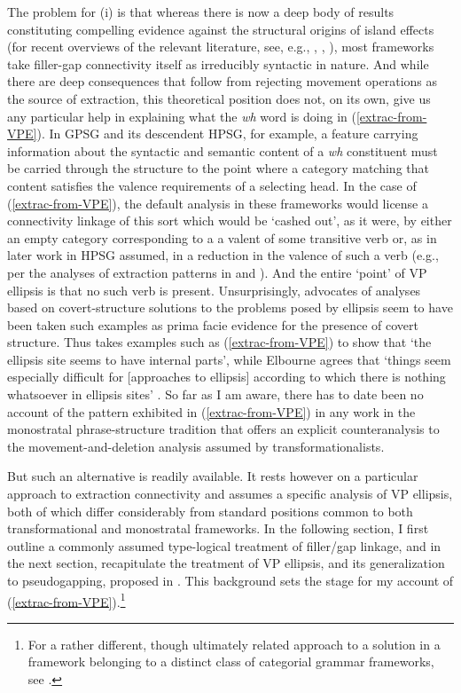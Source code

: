 \documentclass[output=paper,colorlinks,citecolor=brown]{langscibook}
\begin{document}
The problem for (i) is that whereas there is now a deep body of
results constituting compelling evidence against the structural
origins of island effects (for recent overviews of the relevant
literature, see, e.g., \citet{chaves-putnam2020}, \citet{kubotalevineBook}, \citet{liu-et-al2022}),
most frameworks take filler-gap connectivity itself as irreducibly
syntactic in nature. And while there are deep consequences that follow
from rejecting movement operations as the source of extraction, this
theoretical position does not, on its own, give us any particular help
in explaining what the \textit{wh} word is doing in (\ref{extrac-from-VPE}). In
GPSG and its descendent HPSG, for example, a feature carrying
information about the syntactic and semantic content of a \textit{wh}
constituent must be carried through the structure to the point where a
category matching that content satisfies the valence requirements of a
selecting head. In the case of (\ref{extrac-from-VPE}), the default analysis
in these frameworks would license a connectivity linkage of this sort
which would be `cashed out', as it were, by either an empty category
corresponding to a a valent of some transitive verb or, as in later
work in HPSG assumed, in a reduction in the valence of such a verb
(e.g., per the analyses of extraction patterns in \citet{NoordBouma94} and
\citet{BoumaMaloufea01}). And the entire `point' of VP ellipsis is that no such
verb is present. Unsurprisingly, advocates of analyses based on
covert-structure solutions to the problems posed by ellipsis seem to
have been taken such examples as prima facie evidence for the presence
of covert structure.  Thus \citet{johnson2001} takes examples such as
(\ref{extrac-from-VPE}) to show that `the ellipsis site seems to have
internal parts', while Elbourne agrees that `things seem especially
difficult for [approaches to ellipsis] according to which there is
nothing whatsoever in ellipsis sites' \citep[216]{Elbourne2008}.  So far as I
am aware, there has to date been no account of the pattern exhibited
in (\ref{extrac-from-VPE}) in any work in the monostratal phrase-structure
tradition that offers an explicit counteranalysis to the
movement-and-deletion analysis assumed by transformationalists.

But such an alternative is readily available. It rests however on a
particular approach to extraction connectivity and assumes a specific
analysis of VP ellipsis, both of which differ considerably from
standard positions common to both transformational and monostratal
frameworks. In the following section, I first outline a commonly
assumed type-logical treatment of filler/gap linkage, and in the next
section, recapitulate the treatment of VP ellipsis, and its
generalization to pseudogapping, proposed in
\citet{kubota-levine-pseudo}. This background sets the stage for my account
of (\ref{extrac-from-VPE}).\footnote{For a rather different, though
ultimately related approach to a solution in a framework belonging to
a distinct class of categorial grammar frameworks, see \citet{jacobson1992}.} 
\end{document}
